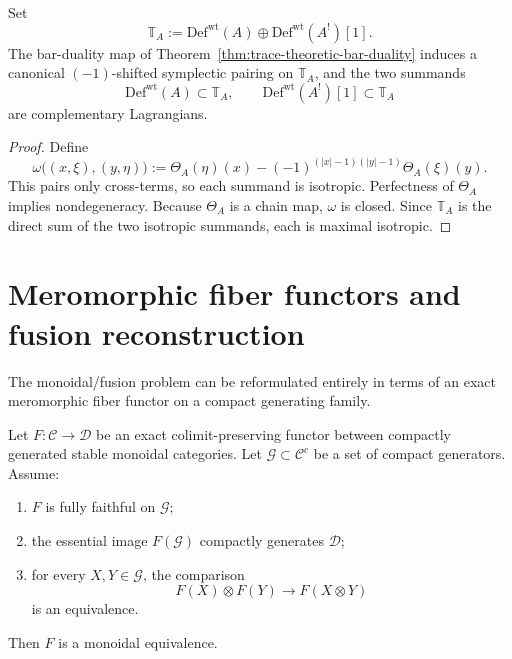 \begin{corollary}
\label{cor:lagrangian-envelope}
Set
\[
\mathbb{T}_A:=\mathrm{Def}^{\mathrm{wt}}(A)\oplus \mathrm{Def}^{\mathrm{wt}}(A^!)[1].
\]
The bar-duality map of Theorem~\ref{thm:trace-theoretic-bar-duality} induces a
canonical $(-1)$-shifted symplectic pairing on $\mathbb{T}_A$, and the two
summands
\[
\mathrm{Def}^{\mathrm{wt}}(A)\subset \mathbb{T}_A,
\qquad
\mathrm{Def}^{\mathrm{wt}}(A^!)[1]\subset \mathbb{T}_A
\]
are complementary Lagrangians.
\end{corollary}

\begin{proof}
Define
\[
\omega\big((x,\xi),(y,\eta)\big)
:=\Theta_A(\eta)(x)-(-1)^{(|x|-1)(|y|-1)}\Theta_A(\xi)(y).
\]
This pairs only cross-terms, so each summand is isotropic. Perfectness of
$\Theta_A$ implies nondegeneracy. Because $\Theta_A$ is a chain map, $\omega$
is closed. Since $\mathbb{T}_A$ is the direct sum of the two isotropic
summands, each is maximal isotropic.
\end{proof}

\section{Meromorphic fiber functors and fusion reconstruction}
\label{sec:meromorphic-fiber-functors-fusion}

The monoidal/fusion problem can be reformulated entirely in terms of an exact
meromorphic fiber functor on a compact generating family.

\begin{lemma}
\label{lem:generator-extension-exact-monoidal}
Let $F\colon \mathcal{C}\to \mathcal{D}$ be an exact colimit-preserving functor
between compactly generated stable monoidal categories. Let
$\mathcal{G}\subset \mathcal{C}^c$ be a set of compact generators. Assume:
\begin{enumerate}[label=\textup{(\roman*)}]
\item $F$ is fully faithful on $\mathcal{G}$;
\item the essential image $F(\mathcal{G})$ compactly generates $\mathcal{D}$;
\item for every $X,Y\in\mathcal{G}$, the comparison
 \[
 F(X)\otimes F(Y)\longrightarrow F(X\otimes Y)
 \]
 is an equivalence.
\end{enumerate}
Then $F$ is a monoidal equivalence.
\end{lemma}

